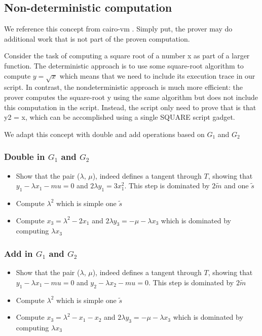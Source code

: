 \subsection{Non-deterministic computation}

We reference this concept from cairo-vm \cite{website:cairo-vm}. Simply put, the prover
may do additional work that is not part of the proven computation.

Consider the task of computing a square root of a number x as part of a larger function.
The deterministic approach is to use some square-root algorithm to compute $ y = \sqrt{x} $ which means that we need to
include its execution trace in our script. In contrast, the nondeterministic approach
is much more efficient: the prover computes the square-root y using the
same algorithm but does not include this computation in the script. Instead, the script only need to prove that is that y2 = x, which can be accomplished using a single SQUARE script gadget.

We adapt this concept with double and add operations based on $G_1$ and $G_2$

\subsubsection{Double in $G_1$ and $G_2$}

\begin{itemize}
    \item Show that the pair ($\lambda$, $\mu$), indeed defines a tangent through $T$, showing that $\displaystyle y_1 - \lambda x_{1} - mu = 0$ 
    and $\displaystyle 2\lambda y_1 = 3x_1^2$. This step is dominated by $2\tilde{m}$ and one $\tilde{s}$
    \item Compute $\lambda^2$ which is simple one $\tilde{s}$
    \item Compute $\displaystyle x_3 = \lambda^2-2x_1$ and $\displaystyle 2\lambda y_3 = -\mu - \lambda x_3$ which is dominated by computing $\lambda x_3$
\end{itemize}

\subsubsection{Add in $G_1$ and $G_2$}

\begin{itemize}
    \item Show that the pair ($\lambda$, $\mu$), indeed defines a tangent through $T$, showing that $\displaystyle y_1 - \lambda x_{1} - mu = 0$ 
    and $\displaystyle y_2 - \lambda x_{2} - mu = 0$. This step is dominated by $2\tilde{m}$
    \item Compute $\lambda^2$ which is simple one $\tilde{s}$
    \item Compute $\displaystyle x_3 = \lambda^2-x_1-x_2$ and $\displaystyle 2\lambda y_3 = -\mu - \lambda x_3$ which is dominated by computing $\lambda x_3$
\end{itemize}
